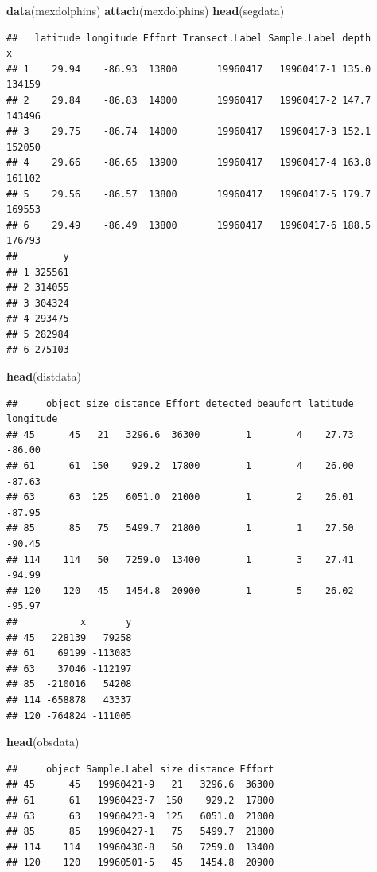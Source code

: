 \documentclass[]{article}
\newenvironment{Shaded}{}{}
\newcommand{\KeywordTok}[1]{\textcolor[rgb]{0.00,0.44,0.13}{\textbf{{#1}}}}
\newcommand{\NormalTok}[1]{{#1}}
\begin{document}
\begin{Shaded}
\begin{Highlighting}[]
\KeywordTok{data}\NormalTok{(mexdolphins)}
\KeywordTok{attach}\NormalTok{(mexdolphins)}
\KeywordTok{head}\NormalTok{(segdata)}
\end{Highlighting}
\end{Shaded}

\begin{verbatim}
##   latitude longitude Effort Transect.Label Sample.Label depth      x
## 1    29.94    -86.93  13800       19960417   19960417-1 135.0 134159
## 2    29.84    -86.83  14000       19960417   19960417-2 147.7 143496
## 3    29.75    -86.74  14000       19960417   19960417-3 152.1 152050
## 4    29.66    -86.65  13900       19960417   19960417-4 163.8 161102
## 5    29.56    -86.57  13800       19960417   19960417-5 179.7 169553
## 6    29.49    -86.49  13800       19960417   19960417-6 188.5 176793
##        y
## 1 325561
## 2 314055
## 3 304324
## 4 293475
## 5 282984
## 6 275103
\end{verbatim}

\begin{Shaded}
\begin{Highlighting}[]
\KeywordTok{head}\NormalTok{(distdata)}
\end{Highlighting}
\end{Shaded}

\begin{verbatim}
##     object size distance Effort detected beaufort latitude longitude
## 45      45   21   3296.6  36300        1        4    27.73    -86.00
## 61      61  150    929.2  17800        1        4    26.00    -87.63
## 63      63  125   6051.0  21000        1        2    26.01    -87.95
## 85      85   75   5499.7  21800        1        1    27.50    -90.45
## 114    114   50   7259.0  13400        1        3    27.41    -94.99
## 120    120   45   1454.8  20900        1        5    26.02    -95.97
##           x       y
## 45   228139   79258
## 61    69199 -113083
## 63    37046 -112197
## 85  -210016   54208
## 114 -658878   43337
## 120 -764824 -111005
\end{verbatim}

\begin{Shaded}
\begin{Highlighting}[]
\KeywordTok{head}\NormalTok{(obsdata)}
\end{Highlighting}
\end{Shaded}

\begin{verbatim}
##     object Sample.Label size distance Effort
## 45      45   19960421-9   21   3296.6  36300
## 61      61   19960423-7  150    929.2  17800
## 63      63   19960423-9  125   6051.0  21000
## 85      85   19960427-1   75   5499.7  21800
## 114    114   19960430-8   50   7259.0  13400
## 120    120   19960501-5   45   1454.8  20900
\end{verbatim}
\end{document}
